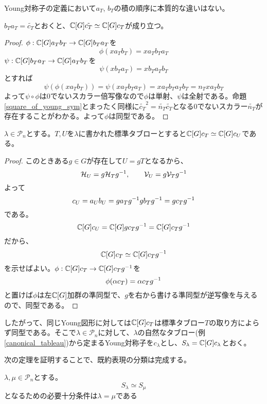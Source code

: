 \documentclass{ltjsreport}
\begin{document}
Young対称子の定義において$a_T$, $b_T$の積の順序に本質的な違いはない。

\begin{prop}\label{reverse_young_sym}
  $b_T a_T=\tilde{c_T}$とおくと、$\mathbb{C}[G]\tilde{c_T}\simeq \mathbb{C}[G]c_T$が成り立つ。
\end{prop}

\begin{proof}
  $\phi:\mathbb{C}[G]a_Tb_T\rightarrow\mathbb{C}[G]b_Ta_T$を
  \[
  \phi(xa_Tb_T)=xa_Tb_Ta_T  
  \]
  $\psi:\mathbb{C}[G]b_Ta_T\rightarrow\mathbb{C}[G]a_Tb_T$を
  \[
  \psi(xb_Ta_T)=xb_Ta_Tb_T  
  \]
  とすれば
  \[
  \psi(\phi(xa_Tb_T))=\psi(xa_Tb_Ta_T)=xa_Tb_Ta_Tb_T=n_Txa_Tb_T  
  \]
  よって$\psi\circ\phi$は0でないスカラー倍写像なので$\phi$は単射、$\psi$は全射である。命題\ref{square_of_young_sym}とまったく同様に$\tilde{c_T}^2=\tilde{n_T}\tilde{c_T}$となる0でないスカラー$\tilde{n_T}$が存在することがわかる。よって$\phi$は同型である。
\end{proof}


\begin{prop}
  $\lambda\in\mathcal{P}_n$とする。$T,U$を$\lambda$に書かれた標準タブローとすると$\mathbb{C}[G]c_T\simeq \mathbb{C}[G]c_U$である。
\end{prop}

\begin{proof}
  このときある$g\in G$が存在して$U=gT$となるから、
  \[
  \mathcal{H}_U=g\mathcal{H}_Tg^{-1},\qquad \mathcal{V}_U=g\mathcal{V}_Tg^{-1}  
  \]
  よって
  \[
  c_U=a_Ub_U=ga_Tg^{-1}gb_Tg^{-1}=gc_Tg^{-1}  
  \]
  である。
  \[
  \mathbb{C}[G]c_U=\mathbb{C}[G]gc_Tg^{-1}=\mathbb{C}[G]c_Tg^{-1}  
  \]
  だから、
  \[
  \mathbb{C}[G]c_T\simeq \mathbb{C}[G]c_Tg^{-1}  
  \]
  を示せばよい。$\phi:\mathbb{C}[G]c_T\rightarrow\mathbb{C}[G]c_Tg^{-1}$を
  \[
  \phi(\alpha c_T)=\alpha c_Tg^{-1}  
  \]
  と置けば$\phi$は左$\mathbb{C}[G]$加群の準同型で、$g$を右から書ける準同型が逆写像を与えるので、同型である。
\end{proof}


したがって、同じYoung図形に対しては$\mathbb{C}[G]c_T$は標準タブロー$T$の取り方によらず同型である。そこで$\lambda\in\mathcal{P}_n$に対して、$\lambda$の自然なタブロー(例\ref{canonical_tableau})から定まるYoung対称子を$c_\lambda$とし、$S_\lambda=\mathbb{C}[G]c_\lambda$とおく。





次の定理を証明することで、既約表現の分類は完成する。

\begin{theo}\label{young_and_irr_rep}
  $\lambda,\mu\in\mathcal{P}_n$とする。
  \[
  S_\lambda\simeq S_\mu 
  \]
  となるための必要十分条件は$\lambda=\mu$である
\end{theo}
\end{document}
